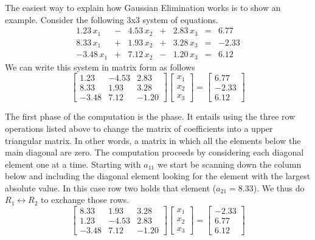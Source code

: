 The easiest way to explain how Gaussian Elimination works is to show an example. Consider the
following 3x3 system of equations.
\begin{displaymath}
\begin{array}{rcrcrcr}
 1.23\, x_1 & - & 4.53\, x_2 & + & 2.83\, x_3 & = &  6.77  \\
 8.33\, x_1 & + & 1.93\, x_2 & + & 3.28\, x_3 & = & -2.33 \\
-3.48\, x_1 & + & 7.12\, x_2 & - & 1.20\, x_3 & = &  6.12
\end{array}
\end{displaymath}
We can write this system in matrix form as follows
\begin{displaymath}
\left[
\begin{array}{rrr}
  1.23 & -4.53 &  2.83 \\
  8.33 &  1.93 &  3.28 \\
 -3.48 &  7.12 & -1.20 
\end{array}
\right]
\left[
\begin{array}{ccc}
x_1 \\
x_2 \\
x_3
\end{array}
\right] =
\left[
\begin{array}{rrr}
  6.77 \\
 -2.33 \\
  6.12
\end{array}
\right]
\end{displaymath}

The first phase of the computation is the  phase. It entails using the
three row operations listed above to change the matrix of coefficients into a upper triangular
matrix. In other words, a matrix in which all the elements below the main diagonal are zero. The
computation proceeds by considering each diagonal element one at a time. Starting with $a_{11}$
we start be scanning down the column below and including the diagonal element looking for the
element with the largest absolute value. In this case row two holds that element ($a_{21} =
8.33$). We thus do $R_1 \leftrightarrow R_2$ to exchange those rows.
\begin{displaymath}
\left[
\begin{array}{rrr}
  8.33 &  1.93 &  3.28 \\
  1.23 & -4.53 &  2.83 \\
 -3.48 &  7.12 & -1.20 
\end{array}
\right]
\left[
\begin{array}{ccc}
x_1 \\
x_2 \\
x_3
\end{array}
\right] =
\left[
\begin{array}{rrr}
 -2.33 \\
  6.77 \\
  6.12
\end{array}
\right]
\end{displaymath}

